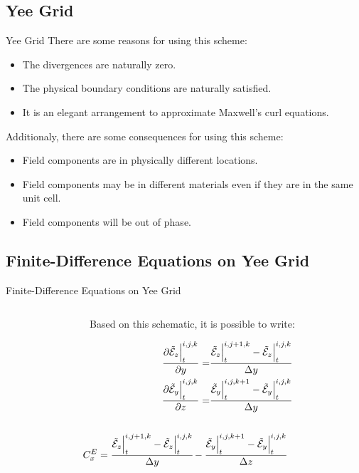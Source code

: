 \documentclass{beamer}
\begin{document}
\subsection{Yee Grid}

\begin{frame}{Yee Grid}
  There are some reasons for using this scheme:
\begin{itemize}
    \item The divergences are naturally zero.
    \item The physical boundary conditions are naturally satisfied.
    \item It is an elegant arrangement to approximate Maxwell's curl equations.
\end{itemize}

Additionaly, there are some consequences for using this scheme:
\begin{itemize}
    \item Field components are in physically different locations.
    \item Field components may be in different materials even if they are in the same unit cell.
    \item Field components will be out of phase.
\end{itemize}
\end{frame}

\subsection{Finite-Difference Equations on Yee Grid}

\begin{frame}{Finite-Difference Equations on Yee Grid}
  \begin{columns}
    \begin{column}{0.50\textwidth}
      \resizebox{\textwidth}{!}
      {
        \centering
        
      }
    \end{column}
    \begin{column}{0.5\textwidth}
      Based on this schematic, it is possible to write:
      \begin{small}
        \begin{align}
            \frac{\partial \tilde{\mathcal{E}}_z\Big|^{i,j,k}_t}{\partial y} =& \cfrac{\tilde{\mathcal{E}}_z\Big|^{i,j+1,k}_t-\tilde{\mathcal{E}}_z\Big|^{i,j,k}_t}{\Delta y} \\
            \frac{\partial \tilde{\mathcal{E}}_y\Big|^{i,j,k}_t}{\partial z} =& \cfrac{\tilde{\mathcal{E}}_y\Big|^{i,j,k+1}_t-\tilde{\mathcal{E}}_y\Big|^{i,j,k}_t}{\Delta y}
        \end{align}    

      \end{small}
    \end{column}

  \end{columns}
  \begin{align}
    C_x^E = \cfrac{\tilde{\mathcal{E}}_z\Big|^{i,j+1,k}_t-\tilde{\mathcal{E}}_z\Big|^{i,j,k}_t}{\Delta y} - \cfrac{\tilde{\mathcal{E}}_y\Big|^{i,j,k+1}_t-\tilde{\mathcal{E}}_y\Big|^{i,j,k}_t}{\Delta z}
    \label{eq:CEx}
\end{align}
\end{frame}
\end{document}
